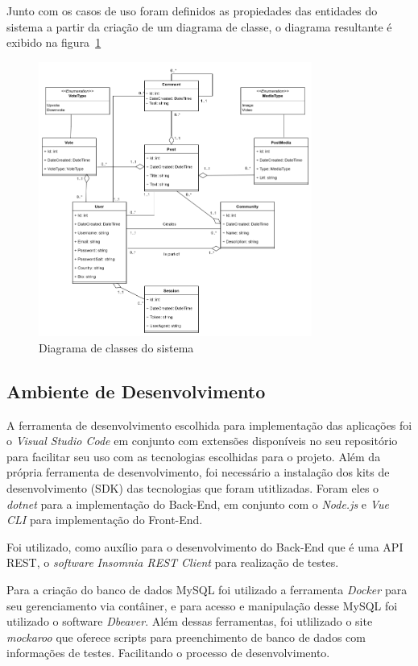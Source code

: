 \documentclass[12pt]{article}
\begin{document}
Junto com os casos de uso foram definidos as propiedades das entidades do sistema
a partir da criação de um diagrama de classe, o diagrama resultante é exibido na figura~\ref{fig:classes_diagram}

\begin{figure}[H]
    \centering
    \includegraphics[width=0.8\textwidth]{diagrams/classes_diagram.png}
    \caption{Diagrama de classes do sistema}\label{fig:classes_diagram}
\end{figure}

\subsection{Ambiente de Desenvolvimento}

A ferramenta de desenvolvimento escolhida para implementação
das aplicações foi o \textit{Visual Studio Code} em conjunto com extensões disponíveis
no seu repositório para facilitar seu uso com as tecnologias escolhidas para o projeto. Além
da própria ferramenta de desenvolvimento, foi necessário a instalação dos kits de desenvolvimento
(SDK) das tecnologias que foram utitlizadas. Foram eles o \textit{dotnet} para a implementação do Back-End,
em conjunto com o \textit{Node.js} e \textit{Vue CLI} para implementação do Front-End.

Foi utilizado, como auxílio para o desenvolvimento do Back-End que é uma API REST, o
\textit{software} \textit{Insomnia REST Client} para realização de testes.

Para a criação do banco de dados MySQL foi utilizado a ferramenta \textit{Docker} para
seu gerenciamento via contâiner, e para acesso e manipulação desse MySQL foi utilizado o software \textit{Dbeaver}.
Além dessas ferramentas, foi utlilizado o site \textit{mockaroo} que oferece scripts para preenchimento
de banco de dados com informações de testes. Facilitando o processo de desenvolvimento.
\end{document}
